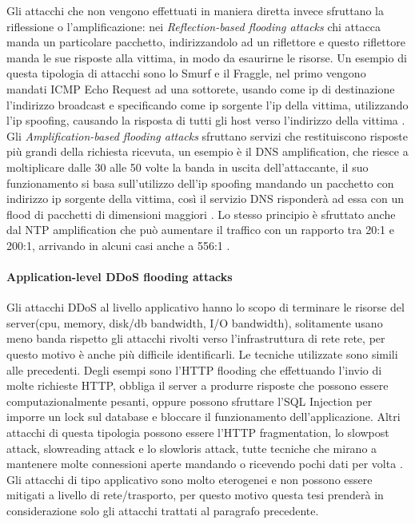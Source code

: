 Gli attacchi che non vengono effettuati in maniera diretta invece sfruttano la riflessione o l'amplificazione: nei \emph{Reflection-based flooding attacks} chi attacca manda un particolare pacchetto, indirizzandolo ad un riflettore e questo riflettore manda le sue risposte alla vittima, in modo da esaurirne le risorse. Un esempio di questa tipologia di attacchi sono lo Smurf e il Fraggle, nel primo vengono mandati ICMP Echo Request ad una sottorete, usando come ip di destinazione l'indirizzo broadcast e specificando come ip sorgente l'ip della vittima, utilizzando l'ip spoofing, causando la risposta di tutti gli host verso l'indirizzo della vittima \cite{ddos_survey_2}.
Gli \emph{Amplification-based flooding attacks} sfruttano servizi che restituiscono risposte più grandi della richiesta ricevuta, un esempio è il DNS amplification, che riesce a moltiplicare dalle 30 alle 50 volte\cite{imperva_amplification} la banda in uscita dell'attaccante, il suo funzionamento si basa sull'utilizzo dell'ip spoofing mandando un pacchetto con indirizzo ip sorgente della vittima, così il servizio DNS risponderà ad essa con un flood di pacchetti di dimensioni maggiori \cite{ddos_survey_1}. Lo stesso principio è sfruttato anche dal NTP amplification che può aumentare il traffico con un rapporto tra 20:1 e 200:1, arrivando in alcuni casi anche a 556:1 \cite{imperva_amplification}. 


\paragraph{Application-level DDoS flooding attacks} %
Gli attacchi DDoS al livello applicativo hanno lo scopo di terminare le risorse del server(cpu, memory, disk/db bandwidth, I/O bandwidth),  solitamente usano meno banda rispetto gli attacchi rivolti verso l'infrastruttura di rete rete, per questo motivo è anche più difficile identificarli. Le tecniche utilizzate sono simili alle precedenti. Degli esempi sono l'HTTP flooding che effettuando l'invio di molte richieste HTTP, obbliga il server a produrre risposte che possono essere computazionalmente pesanti, oppure possono sfruttare l'SQL Injection per imporre un lock sul database e bloccare il funzionamento dell'applicazione. Altri attacchi di questa tipologia possono essere l'HTTP fragmentation, lo slowpost attack, slowreading attack e lo slowloris attack, tutte tecniche che mirano a mantenere molte connessioni aperte mandando o ricevendo pochi dati per volta \cite{ddos_survey_1}.
Gli attacchi di tipo applicativo sono molto eterogenei e non possono essere mitigati a livello di rete/trasporto, per questo motivo questa tesi prenderà in considerazione solo gli attacchi trattati al paragrafo precedente.

